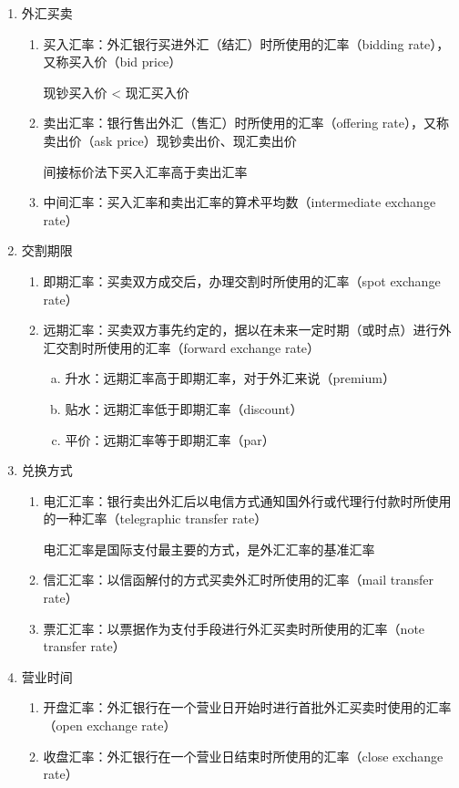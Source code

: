 \documentclass[12pt]{book}
\begin{document}
\begin{enumerate}[1.]
    \item 外汇买卖	
    \begin{enumerate}[(1)]
        \item 买入汇率：外汇银行买进外汇（结汇）时所使用的汇率（bidding rate），又称买入价（bid price）  
        \par 现钞买入价 < 现汇买入价  
        \item 卖出汇率：银行售出外汇（售汇）时所使用的汇率（offering rate），又称卖出价（ask price）现钞卖出价、现汇卖出价  
        \par 间接标价法下买入汇率高于卖出汇率  
        \item 中间汇率：买入汇率和卖出汇率的算术平均数（intermediate exchange rate）  
    \end{enumerate}
    \item 交割期限	
    \begin{enumerate}[(1)]
        \item 即期汇率：买卖双方成交后，办理交割时所使用的汇率（spot exchange rate）  
        \item 远期汇率：买卖双方事先约定的，据以在未来一定时期（或时点）进行外汇交割时所使用的汇率（forward exchange rate）  
        \begin{enumerate}[a.]
            \item 升水：远期汇率高于即期汇率，对于外汇来说（premium）  
            \item 贴水：远期汇率低于即期汇率（discount）  
            \item 平价：远期汇率等于即期汇率（par）
        \end{enumerate}
    \end{enumerate}
    \item 兑换方式
    \begin{enumerate}[(1)]
        \item 电汇汇率：银行卖出外汇后以电信方式通知国外行或代理行付款时所使用的一种汇率（telegraphic transfer rate）  
        \par 电汇汇率是国际支付最主要的方式，是外汇汇率的基准汇率  
        \item 信汇汇率：以信函解付的方式买卖外汇时所使用的汇率（mail transfer rate）  
        \item 票汇汇率：以票据作为支付手段进行外汇买卖时所使用的汇率（note transfer rate）    
    \end{enumerate}	
    \item 营业时间
    \begin{enumerate}[(1)]
        \item 开盘汇率：外汇银行在一个营业日开始时进行首批外汇买卖时使用的汇率（open exchange rate）  
        \item 收盘汇率：外汇银行在一个营业日结束时所使用的汇率（close exchange rate）
    \end{enumerate}	 
\end{enumerate}
\end{document}
